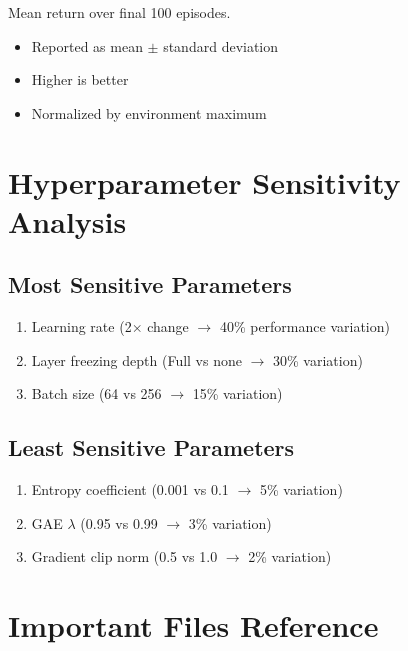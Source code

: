 \documentclass[12pt,a4paper,openany]{report}
\begin{document}
Mean return over final 100 episodes.

\begin{itemize}
    \item Reported as mean $\pm$ standard deviation
    \item Higher is better
    \item Normalized by environment maximum
\end{itemize}

\chapter{Hyperparameter Sensitivity Analysis}

\section{Most Sensitive Parameters}

\begin{enumerate}
    \item Learning rate (2$\times$ change $\to$ 40\% performance variation)
    \item Layer freezing depth (Full vs none $\to$ 30\% variation)
    \item Batch size (64 vs 256 $\to$ 15\% variation)
\end{enumerate}

\section{Least Sensitive Parameters}

\begin{enumerate}
    \item Entropy coefficient (0.001 vs 0.1 $\to$ 5\% variation)
    \item GAE $\lambda$ (0.95 vs 0.99 $\to$ 3\% variation)
    \item Gradient clip norm (0.5 vs 1.0 $\to$ 2\% variation)
\end{enumerate}

\chapter{Important Files Reference}
\end{document}
